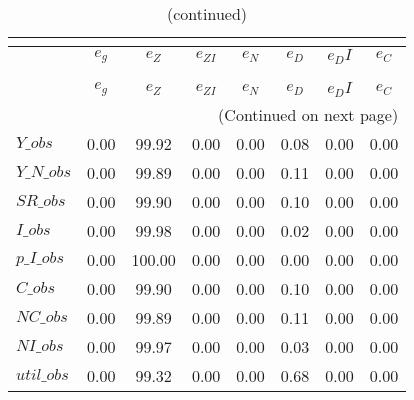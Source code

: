  
\begin{center}
\begin{longtable}{lccccccc} 
\caption{VARIANCE DECOMPOSITION (in percent)}\\
 \label{Table:th_var_decomp_uncond}\\
\toprule 
$           $	 & 	 $       {e_g}$	 & 	 $       {e_Z}$	 & 	 $    {e_{ZI}}$	 & 	 $       {e_N}$	 & 	 $       {e_D}$	 & 	 $      {e_DI}$	 & 	 $       {e_C}$\\
\midrule \endfirsthead 
\caption{(continued)}\\
 \toprule \\ 
$           $	 & 	 $       {e_g}$	 & 	 $       {e_Z}$	 & 	 $    {e_{ZI}}$	 & 	 $       {e_N}$	 & 	 $       {e_D}$	 & 	 $      {e_DI}$	 & 	 $       {e_C}$\\
\midrule \endhead 
\midrule \multicolumn{8}{r}{(Continued on next page)} \\ \bottomrule \endfoot 
\bottomrule \endlastfoot 
$Y\_obs     $	 & 	        0.00	 & 	       99.92	 & 	        0.00	 & 	        0.00	 & 	        0.08	 & 	        0.00	 & 	        0.00 \\ 
$Y\_N\_obs  $	 & 	        0.00	 & 	       99.89	 & 	        0.00	 & 	        0.00	 & 	        0.11	 & 	        0.00	 & 	        0.00 \\ 
$SR\_obs    $	 & 	        0.00	 & 	       99.90	 & 	        0.00	 & 	        0.00	 & 	        0.10	 & 	        0.00	 & 	        0.00 \\ 
$I\_obs     $	 & 	        0.00	 & 	       99.98	 & 	        0.00	 & 	        0.00	 & 	        0.02	 & 	        0.00	 & 	        0.00 \\ 
$p\_I\_obs  $	 & 	        0.00	 & 	      100.00	 & 	        0.00	 & 	        0.00	 & 	        0.00	 & 	        0.00	 & 	        0.00 \\ 
$C\_obs     $	 & 	        0.00	 & 	       99.90	 & 	        0.00	 & 	        0.00	 & 	        0.10	 & 	        0.00	 & 	        0.00 \\ 
$NC\_obs    $	 & 	        0.00	 & 	       99.89	 & 	        0.00	 & 	        0.00	 & 	        0.11	 & 	        0.00	 & 	        0.00 \\ 
$NI\_obs    $	 & 	        0.00	 & 	       99.97	 & 	        0.00	 & 	        0.00	 & 	        0.03	 & 	        0.00	 & 	        0.00 \\ 
$util\_obs  $	 & 	        0.00	 & 	       99.32	 & 	        0.00	 & 	        0.00	 & 	        0.68	 & 	        0.00	 & 	        0.00 \\ 

\end{longtable}
\end{center}
